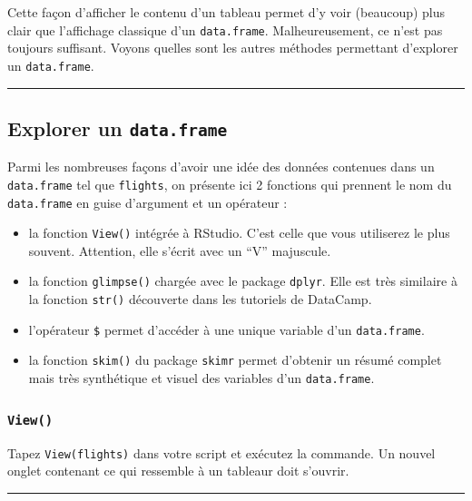\documentclass[
  a4paper,
]{article}
\providecommand{\tightlist}{%
  \setlength{\itemsep}{0pt}\setlength{\parskip}{0pt}}
\begin{document}
Cette façon d'afficher le contenu d'un tableau permet d'y voir (beaucoup) plus clair que l'affichage classique d'un \texttt{data.frame}. Malheureusement, ce n'est pas toujours suffisant. Voyons quelles sont les autres méthodes permettant d'explorer un \texttt{data.frame}.

\begin{center}\rule{0.5\linewidth}{0.5pt}\end{center}

\hypertarget{explorer-un-data.frame}{%
\subsection{\texorpdfstring{Explorer un \texttt{data.frame}}{Explorer un data.frame}}\label{explorer-un-data.frame}}

Parmi les nombreuses façons d'avoir une idée des données contenues dans un \texttt{data.frame} tel que \texttt{flights}, on présente ici 2 fonctions qui prennent le nom du \texttt{data.frame} en guise d'argument et un opérateur :

\begin{itemize}
\tightlist
\item
  la fonction \texttt{View()} intégrée à RStudio. C'est celle que vous utiliserez le plus souvent. Attention, elle s'écrit avec un ``V'' majuscule.
\item
  la fonction \texttt{glimpse()} chargée avec le package \texttt{dplyr}. Elle est très similaire à la fonction \texttt{str()} découverte dans les tutoriels de DataCamp.
\item
  l'opérateur \texttt{\$} permet d'accéder à une unique variable d'un \texttt{data.frame}.
\item
  la fonction \texttt{skim()} du package \texttt{skimr} permet d'obtenir un résumé complet mais très synthétique et visuel des variables d'un \texttt{data.frame}.
\end{itemize}

\hypertarget{View}{%
\subsubsection{\texorpdfstring{\texttt{View()}}{View()}}\label{View}}

Tapez \texttt{View(flights)} dans votre script et exécutez la commande. Un nouvel onglet contenant ce qui ressemble à un tableaur doit s'ouvrir.

\begin{center}\rule{0.5\linewidth}{0.5pt}\end{center}
\end{document}
